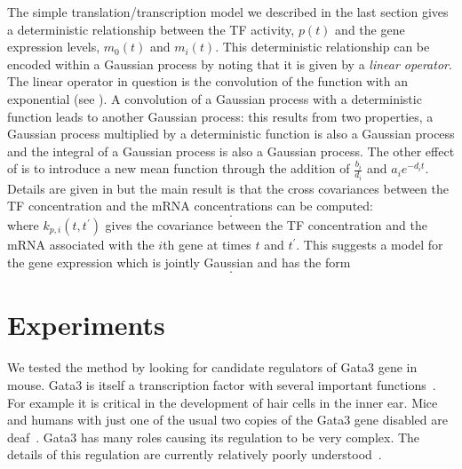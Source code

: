 \documentclass{article}
\begin{document}
The simple  translation/transcription model  we described in  the last
section gives  a deterministic  relationship between the  TF activity,
$p(t)$  and the gene  expression levels,  $m_0(t)$ and  $m_i(t)$. This
deterministic relationship can be encoded within a Gaussian process by
noting  that it  is  given  by a  \emph{linear  operator}. The  linear
operator  in question  is  the  convolution of  the  function with  an
exponential  (see  ).   A  convolution  of  a
Gaussian  process  with  a  deterministic function  leads  to  another
Gaussian process: this results from two properties, a Gaussian process
multiplied by a deterministic function  is also a Gaussian process and
the integral  of a  Gaussian process is  also a Gaussian  process. The
other effect  of  is to introduce  a new mean
function through  the addition  of $\frac{b_i}{d_i}$ and  $a_i e^{-d_i
  t}$.            Details            are           given            in
\cite{Lawrence:transcriptionalGP06,Gao:latent08,Honkela:modelbased10}
but  the main  result is  that the  cross covariances  between  the TF
concentration and the mRNA concentrations can be computed:
\begin{equation}
  .
\end{equation}
where  $k_{p,i}(t,  t^\prime)$ gives  the  covariance  between the  TF
concentration and the mRNA associated with the $i$th gene at times $t$
and $t^\prime$. This suggests a model for the gene expression which is
jointly Gaussian and has the form
\begin{equation}
  .
\end{equation}

\section{Experiments}


We tested the method by looking for candidate regulators of Gata3 gene
in  mouse.   Gata3  is  itself  a transcription  factor  with  several
important  functions~\cite{Chou2010}.  For example  it is  critical in
the development of hair cells in  the inner ear.  Mice and humans with
just  one of  the usual  two  copies of  the Gata3  gene disabled  are
deaf~\cite{Esch2000}.  Gata3 has many  roles causing its regulation to
be  very  complex.  The  details  of  this  regulation  are  currently
relatively poorly understood~\cite{Burch2005}.
\end{document}

